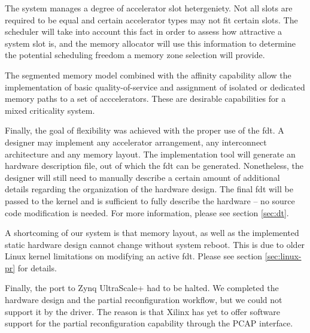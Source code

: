 The system manages a degree of accelerator slot hetergeniety.
Not all slots are required to be equal and certain accelerator types may not fit certain slots.
The scheduler will take into account this fact in order to assess how attractive a system slot is,
and the memory allocator will use this information to determine the potential scheduling freedom 
a memory zone selection will provide.

The segmented memory model combined with the affinity capability allow the implementation of basic quality-of-service
and assignment of isolated or dedicated memory paths to a set of acccelerators.
These are desirable capabilities for a mixed criticality system.

Finally, the goal of flexibility was achieved with the proper use of the \gls{fdt}.
A designer may implement any accelerator arrangement, any interconnect architecture and any memory layout.
The implementation tool will generate an hardware description file, out of which the \gls{fdt} can be generated.
Nonetheless, the designer will still need to manually describe a certain amount of additional details regarding
the organization of the hardware design. The final \gls{fdt} will be passed to the kernel and is sufficient
to fully describe the hardware -- no source code modification is needed.
For more information, please see section \ref{sec:dt}.

A shortcoming of our system is that memory layout, 
as well as the implemented static hardware design
cannot change without system reboot. 
This is due to older Linux kernel limitations on modifying an active \gls{fdt}.
Please see section \ref{sec:linux-pr} for details.

Finally, the port to Zynq UltraScale+ had to be halted. 
We completed the hardware design and the partial reconfiguration workflow,
but we could not support it by the driver.
The reason is that Xilinx has yet to offer software support for 
the partial reconfiguration capability through the PCAP interface.


